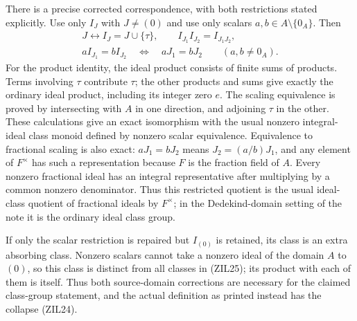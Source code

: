 There is a precise corrected correspondence, with both restrictions
stated explicitly. Use only $I_J$ with $J\ne(0)$ and use only
scalars $a,b\in A\setminus\{0_A\}$. Then
\begin{equation}\tag{ZIL25}
 \begin{gathered}
 J\longleftrightarrow I_J=J\cup\{\tau\},\qquad
 I_{J_1}I_{J_2}=I_{J_1J_2},\\
 aI_{J_1}=bI_{J_2}\quad\Longleftrightarrow\quad
 aJ_1=bJ_2\qquad(a,b\ne0_A).
 \end{gathered}
\end{equation}
For the product identity, the ideal product consists of finite
sums of products. Terms involving $\tau$ contribute $\tau$;
the other products and sums give exactly the ordinary ideal
product, including its integer zero $e$. The scaling equivalence
is proved by intersecting with $A$ in one direction, and adjoining
$\tau$ in the other. These calculations give an exact isomorphism
with the usual nonzero integral-ideal class monoid defined by
nonzero scalar equivalence. Equivalence to fractional scaling is
also exact: $aJ_1=bJ_2$ means $J_2=(a/b)J_1$, and any element
of $F^\times$ has such a representation because $F$ is the
fraction field of $A$. Every nonzero fractional ideal has an integral
representative after multiplying by a common nonzero denominator.
Thus this restricted quotient is the usual ideal-class quotient
of fractional ideals by $F^\times$; in the Dedekind-domain setting
of the note it is the ordinary ideal class group.

If only the scalar restriction is repaired but $I_{(0)}$ is
retained, its class is an extra absorbing class. Nonzero scalars
cannot take a nonzero ideal of the domain $A$ to $(0)$, so this
class is distinct from all classes in (ZIL25); its product with
each of them is itself. Thus both source-domain corrections are
necessary for the claimed class-group statement, and the actual
definition as printed instead has the collapse (ZIL24).

